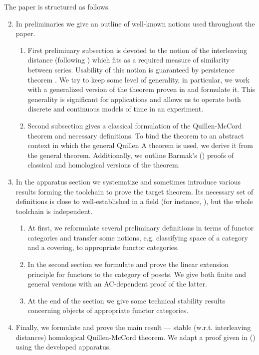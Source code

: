 \documentclass[english,12pt]{article}
\numberwithin{equation}{section}
\theoremstyle{definition}
\theoremstyle{remark}
\begin{document}
The paper is structured as follows.
\begin{enumerate}
  \setcounter{enumi}{1}
  \item In preliminaries we give an outline of well-known notions used throughout the paper.
  \begin{enumerate}[label*=\arabic*.]
    \item First preliminary subsection is devoted to the notion of the interleaving distance (following {\cite{GS16}}) which fits as a required measure of similarity between series. Usability of this notion is guaranteed by persistence theorem {\cite{Zomorodian05}}. We try to keep some level of generality, in particular, we work with a generalized version of the theorem proven in {\cite{Corbet18}} and formulate it. This generality is significant for applications and allows us to operate both discrete and continuous models of time in an experiment.
    \item Second subsection gives a classical formulation of the Quillen-McCord theorem and necessary definitions. To bind the theorem to an abstract context in which the general Quillen A theorem {\cite{Quillen72}} is used, we derive it from the general theorem. Additionally, we outline Barmak's ({\cite{Bar11}}) proofs of classical and homological versions of the theorem.
  \end{enumerate}
  \item In the apparatus section we systematize and sometimes introduce various results forming the toolchain to prove the target theorem. Its necessary set of definitions is close to well-established in a field (for instance, {\cite{Bubenik15}}), but the whole toolchain is independent.
  \begin{enumerate}[label*=\arabic*.]
    \item At first, we reformulate several preliminary definitions in terms of functor categories and transfer some notions, e.g. classifying space of a category and a covering, to appropriate functor categories.
    \item In the second section we formulate and prove the linear extension principle for functors to the category of posets. We give both finite and general versions with an AC-dependent proof of the latter.
    \item At the end of the section we give some technical stability results concerning objects of appropriate functor categories.
  \end{enumerate}
  \item Finally, we formulate and prove the main result --- stable (w.r.t. interleaving distances) homological Quillen-McCord theorem. We adapt a proof given in ({\cite{Bar11}}) using the developed apparatus.
\end{enumerate}
\end{document}
